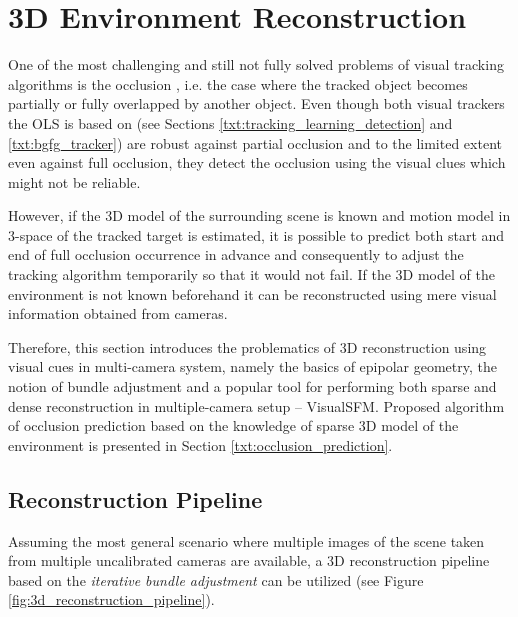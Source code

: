 \section{3D Environment Reconstruction} \label{txt:3d_environment_reconstruction}

One of the most challenging and still not fully solved problems of visual tracking algorithms is the occlusion \cite{Zhang:2010:RVT:1937728.1937766, conf/iccv/KwakNHH11}, i.e. the case where the tracked object becomes partially or fully overlapped by another object. Even though both visual trackers the OLS is based on (see Sections \ref{txt:tracking_learning_detection} and \ref{txt:bgfg_tracker}) are robust against partial occlusion and to the limited extent even against full occlusion, they detect the occlusion using the visual clues which might not be reliable. 

However, if the 3D model of the surrounding scene is known and motion model in 3-space of the tracked target is estimated, it is possible to predict both start and end of full occlusion occurrence in advance and consequently to adjust the tracking algorithm temporarily so that it would not fail. If the 3D model of the environment is not known beforehand it can be reconstructed using mere visual information obtained from cameras.

Therefore, this section introduces the problematics of 3D reconstruction using visual cues in multi-camera system, namely the basics of epipolar geometry, the notion of bundle adjustment and a popular tool for performing both sparse and dense reconstruction in multiple-camera setup -- VisualSFM. Proposed algorithm of occlusion prediction based on the knowledge of sparse 3D model of the environment is presented in Section \ref{txt:occlusion_prediction}. 

\subsection{Reconstruction Pipeline} \label{txt:reconstruction_pipeline}

Assuming the most general scenario where multiple images of the scene taken from multiple uncalibrated cameras are available, a 3D reconstruction pipeline based on the \textit{iterative bundle adjustment} can be utilized \cite{Snavely:2006:PTE:1179352.1141964} (see Figure \ref{fig:3d_reconstruction_pipeline}).

